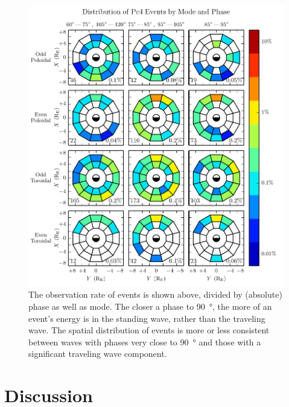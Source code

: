 \begin{figure}[!htb]
    \centering
    \includegraphics[width=\textwidth]{figures/mode_phase.pdf}
    \caption[Observation Rate of Pc4 Events by Mode and Phase]{
      The observation rate of events is shown above, divided by (absolute) phase as well as mode. The closer a phase to \SI{90}{\degree}, the more of an event's energy is in the standing wave, rather than the traveling wave. The spatial distribution of events is more or less consistent between waves with phases very close to \SI{90}{\degree} and those with a significant traveling wave component. 
    }
    \label{fig_mode_phase}
\end{figure}

\section{Discussion}


